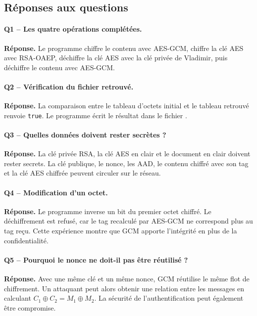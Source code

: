 \documentclass[11pt,a4paper]{article}
\newcommand{\reponse}{\textbf{Réponse.} }
\begin{document}
\subsection{Réponses aux questions}

\paragraph{Q1 -- Les quatre opérations complétées.}
\reponse Le programme chiffre le contenu avec AES-GCM, chiffre la clé AES avec
RSA-OAEP, déchiffre la clé AES avec la clé privée de Vladimir, puis déchiffre le
contenu avec AES-GCM.

\paragraph{Q2 -- Vérification du fichier retrouvé.}
\reponse La comparaison entre le tableau d'octets initial et le tableau retrouvé renvoie
\texttt{true}. Le programme écrit le résultat dans le fichier
.

\paragraph{Q3 -- Quelles données doivent rester secrètes ?}
\reponse La clé privée RSA, la clé AES en clair et le document en clair doivent rester
secrets. La clé publique, le nonce, les AAD, le contenu chiffré avec son tag et la clé
AES chiffrée peuvent circuler sur le réseau.

\paragraph{Q4 -- Modification d'un octet.}
\reponse Le programme inverse un bit du premier octet chiffré. Le déchiffrement est
refusé, car le tag recalculé par AES-GCM ne correspond plus au tag reçu. Cette
expérience montre que GCM apporte l'intégrité en plus de la confidentialité.

\paragraph{Q5 -- Pourquoi le nonce ne doit-il pas être réutilisé ?}
\reponse Avec une même clé et un même nonce, GCM réutilise le même flot de
chiffrement. Un attaquant peut alors obtenir une relation entre les messages en
calculant $C_1\oplus C_2=M_1\oplus M_2$. La sécurité de l'authentification peut
également être compromise.
\end{document}
